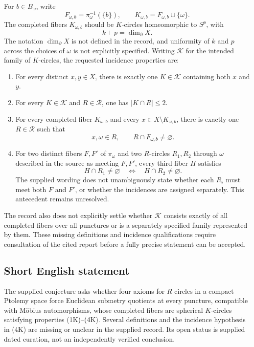 \documentclass[11pt]{article}
\begin{document}
For $b\in B_\omega$, write
\[
F_{\omega,b}=\pi_\omega^{-1}(\{b\}),\qquad
K_{\omega,b}=F_{\omega,b}\cup\{\omega\}.
\]
The completed fibers $K_{\omega,b}$ should be $K$-circles homeomorphic to $S^p$, with
\[
k+p=\dim_\partial X.
\]
The notation $\dim_\partial X$ is not defined in the record, and uniformity of $k$ and $p$ across the choices of $\omega$ is not explicitly specified. Writing $\mathcal K$ for the intended family of $K$-circles, the requested incidence properties are:
\begin{enumerate}
\item[(1K)] For every distinct $x,y\in X$, there is exactly one $K\in\mathcal K$ containing both $x$ and $y$.
\item[(2K)] For every $K\in\mathcal K$ and $R\in\mathcal R$, one has $|K\cap R|\leq2$.
\item[(3K)] For every completed fiber $K_{\omega,b}$ and every $x\in X\setminus K_{\omega,b}$, there is exactly one $R\in\mathcal R$ such that
\[
x,\omega\in R,\qquad R\cap F_{\omega,b}\ne\varnothing.
\]
\item[(4K)] For two distinct fibers $F,F'$ of $\pi_\omega$ and two $R$-circles $R_1,R_2$ through $\omega$ described in the source as meeting $F,F'$, every third fiber $H$ satisfies
\[
H\cap R_1\ne\varnothing\quad\Longleftrightarrow\quad H\cap R_2\ne\varnothing.
\]
The supplied wording does not unambiguously state whether each $R_i$ must meet both $F$ and $F'$, or whether the incidences are assigned separately. This antecedent remains unresolved.
\end{enumerate}
The record also does not explicitly settle whether $\mathcal K$ consists exactly of all completed fibers over all punctures or is a separately specified family represented by them. These missing definitions and incidence qualifications require consultation of the cited report before a fully precise statement can be accepted.
\subsection{Short English statement}
The supplied conjecture asks whether four axioms for $R$-circles in a compact Ptolemy space force Euclidean submetry quotients at every puncture, compatible with Möbius automorphisms, whose completed fibers are spherical $K$-circles satisfying properties (1K)--(4K). Several definitions and the incidence hypothesis in (4K) are missing or unclear in the supplied record. Its open status is supplied dated curation, not an independently verified conclusion.
\end{document}
